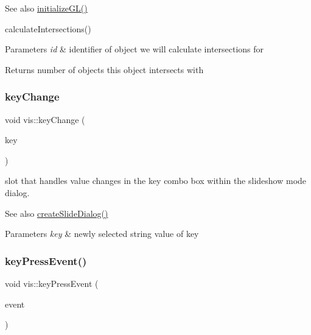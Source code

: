 \begin{DoxySeeAlso}{See also}
\mbox{\hyperlink{classvis_aacc3b133f9fae3b66e1e13bfe789f314}{initialize\+G\+L()}} 

calculate\+Intersections() 
\end{DoxySeeAlso}

\begin{DoxyParams}{Parameters}
{\em id} & identifier of object we will calculate intersections for \\
\hline
\end{DoxyParams}
\begin{DoxyReturn}{Returns}
number of objects this object intersects with 
\end{DoxyReturn}
\mbox{\label{classvis_aac05bc47936f37805e95dc251fd70035}} 
\subsubsection{\texorpdfstring{key\+Change}{keyChange}}
{\footnotesize\ttfamily void vis\+::key\+Change (\begin{DoxyParamCaption}\item[{Q\+String}]{key }\end{DoxyParamCaption})\hspace{0.3cm}{\ttfamily [slot]}}

slot that handles value changes in the key combo box within the slideshow mode dialog.

\begin{DoxySeeAlso}{See also}
\mbox{\hyperlink{classvis_a09be90ab62dec1dcf2a72690d254acfb}{create\+Slide\+Dialog()}} 
\end{DoxySeeAlso}

\begin{DoxyParams}{Parameters}
{\em key} & newly selected string value of key \\
\hline
\end{DoxyParams}
\mbox{\label{classvis_a067c6621db4af8a2b34fe00a349b44db}} 
\subsubsection{\texorpdfstring{key\+Press\+Event()}{keyPressEvent()}}
{\footnotesize\ttfamily void vis\+::key\+Press\+Event (\begin{DoxyParamCaption}\item[{Q\+Key\+Event $\ast$}]{event }\end{DoxyParamCaption})\hspace{0.3cm}{\ttfamily [protected]}}

